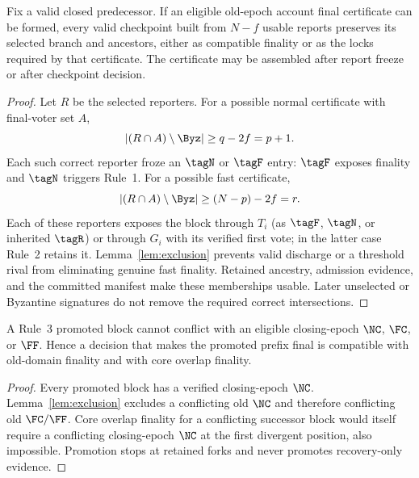 \begin{theorem}
\label{thm:closure}
Fix a valid closed predecessor. If an eligible old-epoch account final certificate can be formed, every valid checkpoint built from $N-f$ usable reports preserves its selected branch and ancestors, either as compatible finality or as the locks required by that certificate. The certificate may be assembled after report freeze or after checkpoint decision.
\end{theorem}
\begin{proof}
Let $R$ be the selected reporters. For a possible normal certificate with final-voter set $A$,
\[
|(R\cap A)\setminus\Byz|\ge q-2f=p+1.
\]
Each such correct reporter froze an $\tagN$ or $\tagF$ entry: $\tagF$ exposes finality and $\tagN$ triggers Rule~1. For a possible fast certificate,
\[
|(R\cap A)\setminus\Byz|\ge (N-p)-2f=r.
\]
Each of these reporters exposes the block through $T_i$ (as $\tagF$, $\tagN$, or inherited $\tagR$) or through $G_i$ with its verified first vote; in the latter case Rule~2 retains it. Lemma~\ref{lem:exclusion} prevents valid discharge or a threshold rival from eliminating genuine fast finality. Retained ancestry, admission evidence, and the committed manifest make these memberships usable. Later unselected or Byzantine signatures do not remove the required correct intersections.
\end{proof}

\begin{lemma}
\label{lem:promotion}
A Rule~3 promoted block cannot conflict with an eligible closing-epoch $\NC$, $\FC$, or $\FF$. Hence a decision that makes the promoted prefix final is compatible with old-domain finality and with core overlap finality.
\end{lemma}
\begin{proof}
Every promoted block has a verified closing-epoch $\NC$. Lemma~\ref{lem:exclusion} excludes a conflicting old $\NC$ and therefore conflicting old $\FC/\FF$. Core overlap finality for a conflicting successor block would itself require a conflicting closing-epoch $\NC$ at the first divergent position, also impossible. Promotion stops at retained forks and never promotes recovery-only evidence.
\end{proof}

